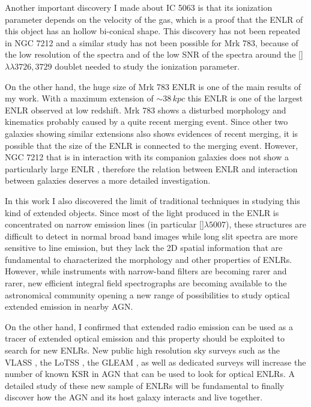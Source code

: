 \documentclass[../thesis.tex]{subfiles}
\begin{document}
Another important discovery I made about IC 5063 is that its ionization parameter depends on the velocity of the gas, which is a proof that the ENLR of this object has an hollow bi-conical shape.
This discovery has not been repeated in NGC 7212 and a similar study has not been possible for Mrk 783, because of the low resolution of the spectra and of the low SNR of the spectra around the []$\lambda\lambda3726,3729$ doublet needed to study the ionization parameter.

On the other hand, the huge size of Mrk 783 ENLR is one of the main results of my work.
With a maximum extension of $\sim 38\,\si{kpc}$ this ENLR is one of the largest ENLR observed at low redshift.
Mrk 783 shows a disturbed morphology and kinematics probably caused by a quite recent merging event.
Since other two galaxies showing similar extensions \citep[UGC 7342 and NGC 5972][]{Keel12} also shows evidences of recent merging, it is possible that the size of the ENLR is connected to the merging event.
However, NGC 7212 that is in interaction with its companion galaxies does not show a particularly large ENLR \citep{Cracco11}, therefore the relation between ENLR and interaction between galaxies deserves a more detailed investigation.

In this work I also discovered the limit of traditional techniques in studying this kind of extended objects.
Since most of the light produced in the ENLR is concentrated on narrow emission lines (in particular []$\lambda5007$), these structures are difficult to detect in normal broad band images \citep[e.g.][]{Sun18} while long slit spectra are more sensitive to line emission, but they lack the 2D spatial information that are fundamental to characterized the morphology and other properties of ENLRs.
However, while instruments with narrow-band filters are becoming rarer and rarer, new efficient integral field spectrographs are becoming available to the astronomical community opening a new range of possibilities to study optical extended emission in nearby AGN.

On the other hand, I confirmed that extended radio emission can be used as a tracer of extended optical emission and this property should be exploited to search for new ENLRs.
New public high resolution sky surveys such as the VLASS \citep[VLA Sky Survey][]{Hales13}, the LoTSS \citep[LOFAR two meter sky survey][]{Shimwell17}, the GLEAM \citep[GaLactic and Extragalactic All-sky MWA Survey][]{Hurley17}, as well as dedicated surveys will increase the number of known KSR in AGN that can be used to look for optical ENLRs.
A detailed study of these new sample of ENLRs will be fundamental to finally discover how the AGN and its host galaxy interacts and live together.
\end{document}
